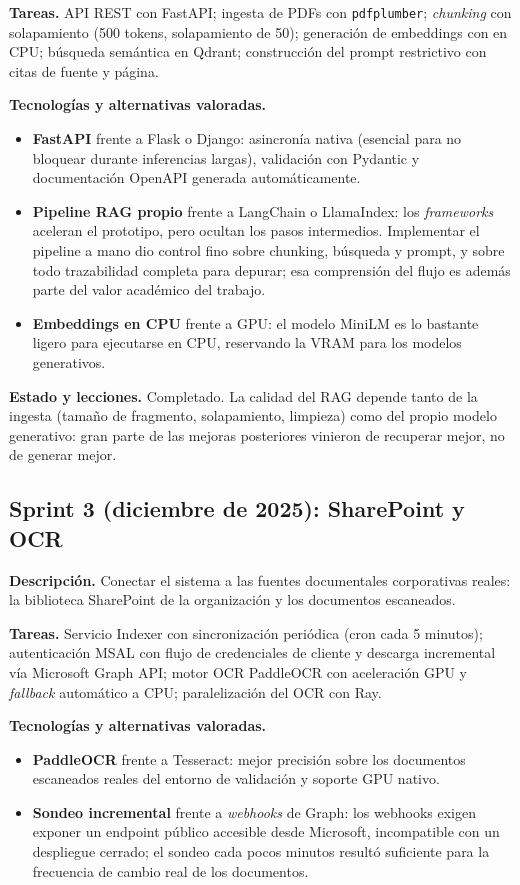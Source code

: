 \textbf{Tareas.} API REST con FastAPI; ingesta de PDFs con \texttt{pdfplumber}; \textit{chunking} con solapamiento (500 tokens, solapamiento de 50); generación de embeddings con  en CPU; búsqueda semántica en Qdrant; construcción del prompt restrictivo con citas de fuente y página.

\textbf{Tecnologías y alternativas valoradas.}
\begin{itemize}
    \item \textbf{FastAPI} frente a Flask o Django: asincronía nativa (esencial para no bloquear durante inferencias largas), validación con Pydantic y documentación OpenAPI generada automáticamente.
    \item \textbf{Pipeline RAG propio} frente a LangChain o LlamaIndex: los \textit{frameworks} aceleran el prototipo, pero ocultan los pasos intermedios. Implementar el pipeline a mano dio control fino sobre chunking, búsqueda y prompt, y sobre todo trazabilidad completa para depurar; esa comprensión del flujo es además parte del valor académico del trabajo.
    \item \textbf{Embeddings en CPU} frente a GPU: el modelo MiniLM es lo bastante ligero para ejecutarse en CPU, reservando la VRAM para los modelos generativos.
\end{itemize}

\textbf{Estado y lecciones.} Completado. La calidad del RAG depende tanto de la ingesta (tamaño de fragmento, solapamiento, limpieza) como del propio modelo generativo: gran parte de las mejoras posteriores vinieron de recuperar mejor, no de generar mejor.

\subsection{Sprint 3 (diciembre de 2025): SharePoint y OCR}

\textbf{Descripción.} Conectar el sistema a las fuentes documentales corporativas reales: la biblioteca SharePoint de la organización y los documentos escaneados.

\textbf{Tareas.} Servicio Indexer con sincronización periódica (cron cada 5 minutos); autenticación MSAL con flujo de credenciales de cliente y descarga incremental vía Microsoft Graph API; motor OCR PaddleOCR con aceleración GPU y \textit{fallback} automático a CPU; paralelización del OCR con Ray.

\textbf{Tecnologías y alternativas valoradas.}
\begin{itemize}
    \item \textbf{PaddleOCR} frente a Tesseract: mejor precisión sobre los documentos escaneados reales del entorno de validación y soporte GPU nativo.
    \item \textbf{Sondeo incremental} frente a \textit{webhooks} de Graph: los webhooks exigen exponer un endpoint público accesible desde Microsoft, incompatible con un despliegue cerrado; el sondeo cada pocos minutos resultó suficiente para la frecuencia de cambio real de los documentos.
\end{itemize}

